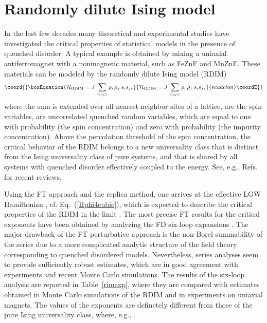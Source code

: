 \documentclass[a4paper,12pt]{article}
\begin{document}
\section{Randomly dilute Ising model}
\label{random}

In the last few decades many theoretical and experimental
studies have investigated the critical properties
of statistical models in the presence of quenched disorder.
A typical example is obtained by mixing a
uniaxial antiferromagnet with a nonmagnetic material,
such as Fe\coordHE{}Zn\coordHE{}F\coordHE{} and Mn\coordHE{}Zn\coordHE{}F\coordHE{}.
These materials can be modeled by the randomly dilute Ising model (RDIM)
\begin{equation}\coord{}\boxEquation{
{\cal H}_{\rm RDIM} = J\,\sum_{<ij>}  \rho_i \,\rho_j \; s_i s_j,
\label{latticeH}
}{
{\cal H}_{\rm RDIM} = J\,\sum_{<ij>}  \rho_i \,\rho_j \; s_i s_j,
}{ecuacion}\coordE{}\end{equation}
where the sum is extended over all nearest-neighbor sites of a 
lattice,
\coordHE{} are the spin variables,
\coordHE{} are uncorrelated quenched random variables, which are equal to one 
with probability \coordHE{} (the spin concentration) and zero with probability \coordHE{}
(the impurity concentration). 
Above the percolation threshold of the spin concentration,
the critical behavior of the RDIM belongs to a new 
universality class that is distinct from the Ising universality class
of pure systems, and that is shared by all systems with quenched
disorder effectively coupled to the energy.
See, e.g., Refs. \cite{Belanger-00,FHY-01,review} for recent reviews.

Using the FT approach and the replica method, one arrives at
the effective LGW Hamiltonian \coordHE{} \cite{GL-76}, 
cf. Eq.~(\ref{Hphi4cubic}),
which is expected to describe the critical properties of the RDIM
in the limit \coordHE{}.
The most precise FT results for the critical exponents
have been obtained by analyzing the FD six-loop expansions \cite{PV-00,PS-00}.
The major drawback of the FT perturbative approach is the non-Borel summability 
of the series due to a more complicated analytic structure of the field theory  
corresponding to quenched disordered models. 
Nevertheless, series analyses seem to provide 
sufficiently robust estimates, which are in good agreement 
with experiments and recent Monte Carlo simulations.
The results of the six-loop analysis 
are reported in Table~\ref{rimexp}, where they are 
compared with estimates obtained in Monte Carlo simulations of the RDIM 
and in experiments on uniaxial magnets.
The values of the exponents are definetely different
from those of the pure Ising universality class, where, e.g.,
\coordHE{} \cite{CPRV-ising}.
\end{document}
